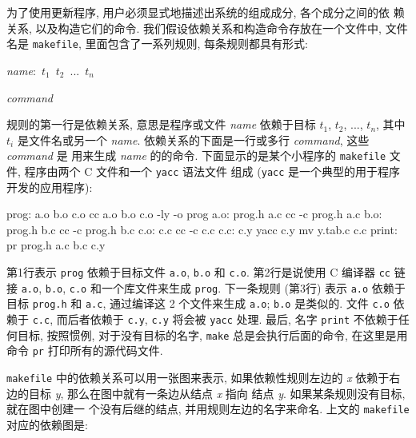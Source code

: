 为了使用更新程序, 用户必须显式地描述出系统的组成成分, 各个成分之间的依
赖关系, 以及构造它们的命令. 我们假设依赖关系和构造命令存放在一个文件中, 
文件名是 \texttt{makefile}, 里面包含了一系列规则, 每条规则都具有形式:
\begin{pattern}
    \indent\textit{name}:\texttt{    }$t_1$\ $t_2$\ ...\ $t_n$ \par 
    \indent\indent\textit{command}
\end{pattern}
规则的第一行是依赖关系, 意思是程序或文件 \textit{name} 依赖于目标
$t_1$, $t_2$, ..., $t_n$, 其中 $t_i$ 是文件名或另一个 \textit{name}.
依赖关系的下面是一行或多行 \textit{command}, 这些 \textit{command} 是
用来生成 \textit{name} 的的命令. 下面显示的是某个小程序的
\texttt{makefile} 文件, 程序由两个 C 文件和一个 \texttt{yacc} 语法文件
组成 (\texttt{yacc} 是一个典型的用于程序开发的应用程序):
\begin{file}
    prog:       a.o b.o c.o
                cc a.o b.o c.o -ly -o prog 
    a.o:        prog.h a.c
                cc -c prog.h a.c
    b.o:        prog.h b.c
                cc -c prog.h b.c
    c.o:        c.c
                cc -c c.c
    c.c:        c.y
                yacc c.y
                mv y.tab.c c.c
    print:
                pr prog.h a.c b.c c.y
\end{file}
第1行表示 \texttt{prog} 依赖于目标文件 \texttt{a.o}, \texttt{b.o} 和
\texttt{c.o}. 第2行是说使用 C 编译器 \texttt{cc} 链接 \texttt{a.o},
\texttt{b.o}, \texttt{c.o} 和一个库文件来生成 \texttt{prog}. 下一条规则
(第3行) 表示 \texttt{a.o} 依赖于目标 \texttt{prog.h} 和 \texttt{a.c},
通过编译这 2 个文件来生成 \texttt{a.o}; \texttt{b.o} 是类似的. 文件 
\texttt{c.o} 依赖于 \texttt{c.c}, 而后者依赖于 \texttt{c.y}, \texttt{c.y}
将会被 \texttt{yacc} 处理. 最后, 名字 \texttt{print} 不依赖于任何目标,
按照惯例, 对于没有目标的名字, \texttt{make} 总是会执行后面的命令,
在这里是用命令 \texttt{pr} 打印所有的源代码文件.

\texttt{makefile} 中的依赖关系可以用一张图来表示, 如果依赖性规则左边的
\textit{x} 依赖于右边的目标 \textit{y}, 那么在图中就有一条边从结点
\textit{x} 指向 结点 \textit{y}. 如果某条规则没有目标, 就在图中创建一
个没有后继的结点, 并用规则左边的名字来命名. 上文的 \texttt{makefile}
对应的依赖图是:
\begin{center}
\end{center}

